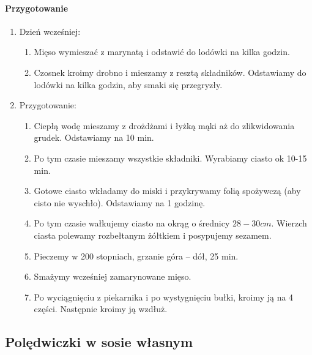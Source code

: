 \documentclass{article}
\begin{document}
    \paragraph{Przygotowanie}
    \begin{enumerate}
    \item Dzień wcześniej:
    \begin{enumerate}
        \item Mięso wymieszać z marynatą i odstawić do lodówki na kilka godzin.
        \item Czosnek kroimy drobno i mieszamy z resztą składników. Odstawiamy
            do lodówki na kilka godzin, aby smaki się przegryzły.
    \end{enumerate}
    \item Przygotowanie:
    \begin{enumerate}
        \item Ciepłą wodę mieszamy z drożdżami i łyżką mąki aż do zlikwidowania
            grudek. Odstawiamy na 10 min.
        \item Po tym czasie mieszamy wszystkie składniki. Wyrabiamy ciasto ok
            10-15 min.
        \item Gotowe ciasto wkładamy do miski i przykrywamy folią spożywczą (aby
            cisto nie wyschło). Odstawiamy na 1 godzinę.
        \item Po tym czasie wałkujemy ciasto na okrąg o średnicy $28-30cm$.
            Wierzch ciasta polewamy rozbełtanym żółtkiem i posypujemy sezamem.
        \item Pieczemy w 200 stopniach, grzanie góra – dół, 25 min.
        \item Smażymy wcześniej zamarynowane mięso.
        \item Po wyciągnięciu z piekarnika i po wystygnięciu bułki, kroimy ją na
            4 części. Następnie kroimy ją wzdłuż.
    \end{enumerate}
    \end{enumerate}
    \newpage




    \subsection{Polędwiczki w sosie własnym}
    \bigskip
\end{document}
